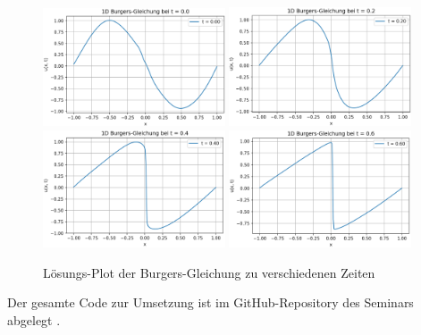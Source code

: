 \begin{figure}
    \includegraphics[width=0.48\textwidth]{papers/neuronal/images/burgers_solution_t0.png}\hfill
    \includegraphics[width=0.48\textwidth]{papers/neuronal/images/burgers_solution_t02.png}
    \\[\smallskipamount]
    \includegraphics[width=0.48\textwidth]{papers/neuronal/images/burgers_solution_t04.png}\hfill
    \includegraphics[width=0.48\textwidth]{papers/neuronal/images/burgers_solution_t06.png}
    \caption{Lösungs-Plot der Burgers-Gleichung zu verschiedenen Zeiten}\label{fig:loesung_burgers_fix_zeit}
\end{figure}

Der gesamte Code zur Umsetzung ist im GitHub-Repository des Seminars abgelegt \cite{neuronal:github_source_code}.

